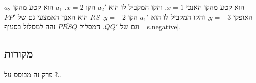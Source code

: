 $a_2$
הוא קטע מהקו האנכי 
$x=1$,
והקו המקביל לו הוא
$a_2'$
הקו
$x=2$.
$a_1$
הוא קטע מהקו האופקי 
$y=-3$,
והקו המקביל לו הוא
$a_1'$
הקו
$y=-2$.
$RS$
הוא האנך האמצעי גם של
$\overline{PP'}$
וגם של
$\overline{QQ'}$.
המסלול
$\overline{PRSQ}$
זהה למסלול בסעיף%
~\ref{s.negative}.

\subsection*{מקורות}

פרק זה מבוסס על
\L{\cite{bradford, hull-beloch, riaz}}.
